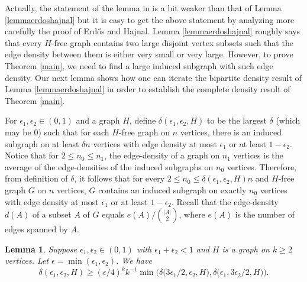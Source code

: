 \documentclass[11pt]{article}
\newtheorem{lemma}[theorem]{Lemma}
\begin{document}
Actually, the statement of the lemma in \cite{ErHa} is a bit weaker
than that of Lemma \ref{lemmaerdoshajnal} but it is easy to get the above statement
by analyzing more carefully the proof of Erd\H{o}s and Hajnal.
Lemma \ref{lemmaerdoshajnal} roughly says that every $H$-free graph
contains two large disjoint vertex subsets such that the edge
density between them is either very small or very large. However, to prove
Theorem \ref{main}, we need to find a large induced subgraph
with such edge density. Our next lemma shows
how one can iterate the bipartite density result of Lemma
\ref{lemmaerdoshajnal} in order to establish the complete density
result of Theorem \ref{main}.

For $\epsilon_1,\epsilon_2 \in (0,1)$ and a graph $H$, define
$\delta(\epsilon_1,\epsilon_2,H)$ to be the largest $\delta$ (which
may be 0) such that for each $H$-free graph on $n$ vertices, there
is an induced subgraph on at least $\delta n$ vertices with edge
density at most $\epsilon_1$ or at least $1-\epsilon_2$. Notice that
for $2 \leq n_0 \leq n_1$, the edge-density of a graph on $n_1$
vertices is the average of the edge-densities of the induced
subgraphs on $n_0$ vertices. Therefore, from definition of $\delta$,
it follows that for every $2 \leq n_0 \leq
\delta(\epsilon_1,\epsilon_2,H) n$ and $H$-free graph $G$ on $n$
vertices, $G$ contains an induced subgraph on exactly $n_0$ vertices
with edge density at most $\epsilon_1$ or at least $1-\epsilon_2$.
Recall that the edge-density $d(A)$ of a subset $A$ of $G$ equals
$e(A)/{|A| \choose 2}$, where $e(A)$ is  the number of edges spanned
by $A$.

\begin{lemma}\label{useful}
Suppose $\epsilon_1,\epsilon_2 \in (0,1)$ with
$\epsilon_1+\epsilon_2<1$ and $H$ is a graph on $k \geq 2$ vertices.
Let $\epsilon=\min(\epsilon_1,\epsilon_2)$. We have
$$\delta(\epsilon_1,\epsilon_2,H) \geq
(\epsilon/4)^{k}k^{-1}\min\Big(\delta\big(3\epsilon_1/2,\epsilon_2,H\big),
\delta\big(\epsilon_1, 3\epsilon_2/2,H\big)\Big).$$
\end{lemma}
\end{document}
